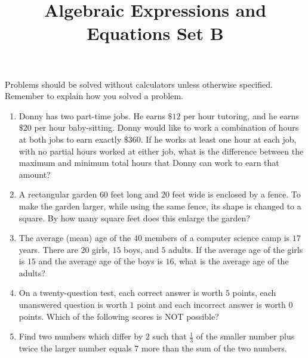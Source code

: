 \documentclass{article}
\title{Algebraic Expressions and Equations Set B}
\author{}
\date{}
\begin{document}
    \maketitle
    \noindent Problems should be solved without calculators unless otherwise
    specified. Remember to explain how you solved a problem.
    \begin{enumerate}
        \item Donny has two part-time jobs. He earns $\$12$ per hour tutoring,
        and he earns $\$20$ per hour baby-sitting. Donny would like to work a
        combination of hours at both jobs to earn exactly $\$360$. If he works
        at least one hour at each job, with no partial hours worked at either
        job, what is the difference between the maximum and minimum total hours
        that Donny can work to earn that amount?
        \vspace{3cm}
        \item A rectangular garden $60$ feet long and $20$ feet wide is enclosed
        by a fence. To make the garden larger, while using the same fence, its
        shape is changed to a square. By how many square feet does this enlarge
        the garden?
        \vspace{3cm}
        \item The average (mean) age of the $40$ members of a computer science
        camp is $17$ years. There are $20$ girls, $15$ boys, and $5$ adults. If
        the average age of the girls is $15$ and the average age of the boys is
        $16$, what is the average age of the adults?
        \vspace{3cm}
        \item On a twenty-question test, each correct answer is worth $5$
        points, each unanswered question is worth $1$ point and each incorrect
        answer is worth $0$ points. Which of the following scores is NOT
        possible?
        \vspace{3cm}
        \item Find two numbers which differ by $2$ such that $\frac{1}{3}$ of
        the smaller number plus twice the larger number equals $7$ more than the
        sum of the two numbers.
        \vspace{3cm}
    \end{enumerate}
\end{document}
